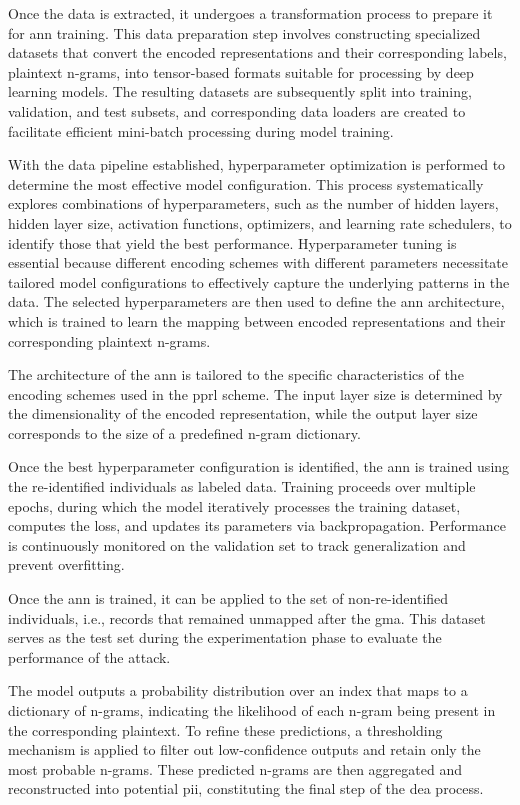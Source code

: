 Once the data is extracted, it undergoes a transformation process to prepare it for \ac{ann} training.
This data preparation step involves constructing specialized datasets that convert the encoded representations and their corresponding labels, plaintext n-grams, into tensor-based formats suitable for processing by deep learning models.
The resulting datasets are subsequently split into training, validation, and test subsets, and corresponding data loaders are created to facilitate efficient mini-batch processing during model training.

With the data pipeline established, hyperparameter optimization is performed to determine the most effective model configuration.
This process systematically explores combinations of hyperparameters, such as the number of hidden layers, hidden layer size, activation functions, optimizers, and learning rate schedulers, to identify those that yield the best performance.
Hyperparameter tuning is essential because different encoding schemes with different parameters necessitate tailored model configurations to effectively capture the underlying patterns in the data.
The selected hyperparameters are then used to define the \ac{ann} architecture, which is trained to learn the mapping between encoded representations and their corresponding plaintext n-grams.


The architecture of the \ac{ann} is tailored to the specific characteristics of the encoding schemes used in the \ac{pprl} scheme.
The input layer size is determined by the dimensionality of the encoded representation, while the output layer size corresponds to the size of a predefined n-gram dictionary.

Once the best hyperparameter configuration is identified, the \ac{ann} is trained using the re-identified individuals as labeled data.
Training proceeds over multiple epochs, during which the model iteratively processes the training dataset, computes the loss, and updates its parameters via backpropagation.
Performance is continuously monitored on the validation set to track generalization and prevent overfitting.

Once the \ac{ann} is trained, it can be applied to the set of non-re-identified individuals, i.e., records that remained unmapped after the \ac{gma}.
This dataset serves as the test set during the experimentation phase to evaluate the performance of the attack.

The model outputs a probability distribution over an index that maps to a dictionary of n-grams, indicating the likelihood of each n-gram being present in the corresponding plaintext.
To refine these predictions, a thresholding mechanism is applied to filter out low-confidence outputs and retain only the most probable n-grams.
These predicted n-grams are then aggregated and reconstructed into potential \ac{pii}, constituting the final step of the \ac{dea} process.

